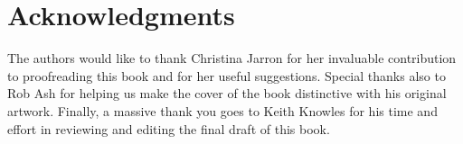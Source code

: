 %
%
%
\chapter*{Acknowledgments}
The authors would like to thank Christina Jarron for her invaluable contribution to proofreading this book and for her useful suggestions. Special thanks also to Rob Ash for helping us make the cover of the book distinctive with his original artwork. Finally, a massive thank you goes to Keith Knowles for his time and effort in reviewing and editing the final draft of this book.


